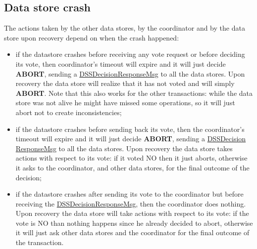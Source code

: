 \subsection{Data store crash}
The actions taken by the other data stores, by the coordinator and by the data store upon recovery depend on when the crash happened:
\begin{itemize}
    \item if the datastore crashes before receiving any vote request or before deciding its vote, then coordinator's timeout will expire and it will just decide \textbf{ABORT}, sending a \url{DSSDecisionResponseMsg} to all the data stores. Upon recovery the data store will realize that it has not voted and will simply \textbf{ABORT}. Note that this also works for the other transactions: while the data store was not alive he might have missed some operations, so it will just abort not to create inconsistencies;
    \item if the datastore crashes before sending back its vote, then the coordinator's timeout will expire and it will just decide \textbf{ABORT}, sending a \url{DSSDecision} \url{ResponseMsg} to all the data stores. Upon recovery the data store takes actions with respect to its vote: if it voted NO then it just aborts, otherwise it asks to the coordinator, and other data stores, for the final outcome of the decision;
    \item if the datastore crashes after sending its vote to the coordinator but before receiving the \url{DSSDecisionResponseMsg}, then the coordinator does nothing. Upon recovery the data store will take actions with respect to its vote: if the vote is NO than nothing happens since he already decided to abort, otherwise it will just ask other data stores and the coordinator for the final outcome of the transaction.
\end{itemize}


